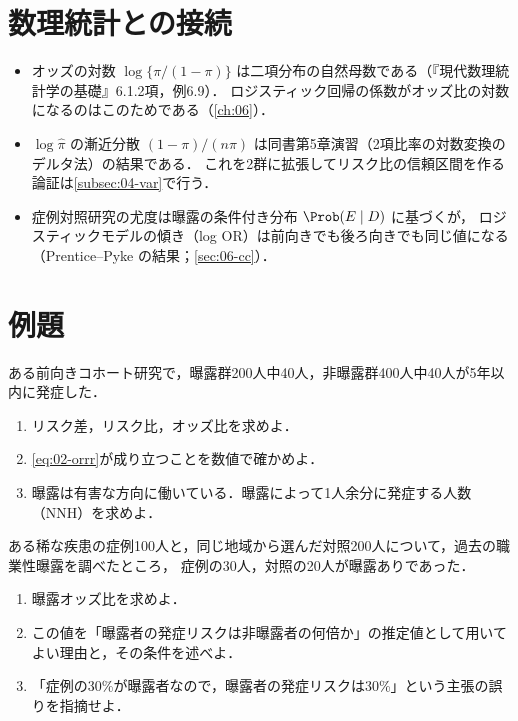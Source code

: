 \section{数理統計との接続}\label{sec:02-link}
\begin{linkbox}
\begin{itemize}
\item オッズの対数 $\log\{\pi/(1-\pi)\}$ は二項分布の自然母数である（『現代数理統計学の基礎』6.1.2項，例6.9）．
      ロジスティック回帰の係数がオッズ比の対数になるのはこのためである（\cref{ch:06}）．
\item $\log\hat\pi$ の漸近分散 $(1-\pi)/(n\pi)$ は同書第5章演習（2項比率の対数変換のデルタ法）の結果である．
      これを2群に拡張してリスク比の信頼区間を作る論証は\cref{subsec:04-var}で行う．
\item 症例対照研究の尤度は曝露の条件付き分布 $\Prob(E\mid D)$ に基づくが，
      ロジスティックモデルの傾き（log OR）は前向きでも後ろ向きでも同じ値になる（Prentice--Pyke の結果；\cref{sec:06-cc}）．
\end{itemize}
\end{linkbox}

\section{例題}\label{sec:02-ex}
\begin{reidai}[効果指標の計算]\label{reidai:02-1}
ある前向きコホート研究で，曝露群200人中40人，非曝露群400人中40人が5年以内に発症した．
\begin{enumerate}[label=(\arabic*)]
\item リスク差，リスク比，オッズ比を求めよ．
\item \cref{eq:02-orrr}が成り立つことを数値で確かめよ．
\item 曝露は有害な方向に働いている．曝露によって1人余分に発症する人数（NNH）を求めよ．
\end{enumerate}
\end{reidai}

\begin{reidai}[症例対照研究]\label{reidai:02-2}
ある稀な疾患の症例100人と，同じ地域から選んだ対照200人について，過去の職業性曝露を調べたところ，
症例の30人，対照の20人が曝露ありであった．
\begin{enumerate}[label=(\arabic*)]
\item 曝露オッズ比を求めよ．
\item この値を「曝露者の発症リスクは非曝露者の何倍か」の推定値として用いてよい理由と，その条件を述べよ．
\item 「症例の30\%が曝露者なので，曝露者の発症リスクは30\%」という主張の誤りを指摘せよ．
\end{enumerate}
\end{reidai}


